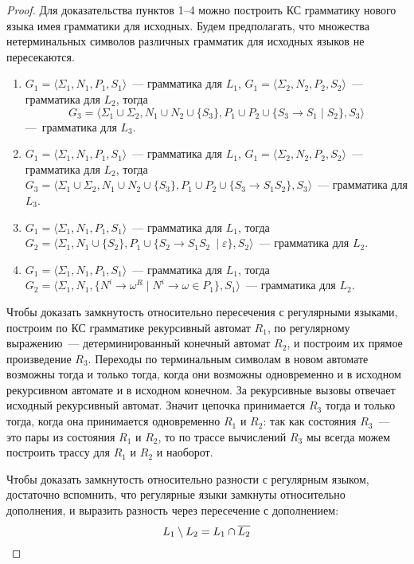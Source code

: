 \begin{proof}
    Для доказательства пунктов 1--4 можно построить КС грамматику нового языка имея грамматики для исходных.
    Будем предполагать, что множества нетерминальных символов различных грамматик для исходных языков не пересекаются.
    \begin{enumerate}
        \item $G_1=\langle\Sigma_1,N_1,P_1,S_1\rangle$~--- грамматика для $L_1$, $G_1=\langle\Sigma_2,N_2,P_2,S_2\rangle$~--- грамматика для $L_2$, тогда 
        \[G_3=\langle\Sigma_1 \cup \Sigma_2, N_1 \cup N_2 \cup \{S_3\}, P_1 \cup P_2 \cup \{S_3 \to S_1 \mid S_2\} ,S_3\rangle\] ---~грамматика для $L_3$.
        \item $G_1=\langle\Sigma_1,N_1,P_1,S_1\rangle$~--- грамматика для $L_1$, $G_1=\langle\Sigma_2,N_2,P_2,S_2\rangle$~--- грамматика для $L_2$, тогда $G_3=\langle\Sigma_1 \cup \Sigma_2, N_1 \cup N_2 \cup \{S_3\}, P_1 \cup P_2 \cup \{S_3 \to S_1 S_2\} ,S_3\rangle$~--- грамматика для $L_3$.
        \item $G_1=\langle\Sigma_1,N_1,P_1,S_1\rangle$~--- грамматика для $L_1$, тогда $G_2=\langle\Sigma_1, N_1 \cup \{S_2\}, P_1 \cup \{S_2 \to S_1 S_2\ \mid \varepsilon\}, S_2\rangle$~--- грамматика для $L_2$.
        \item $G_1=\langle\Sigma_1,N_1,P_1,S_1\rangle$~--- грамматика для $L_1$, тогда $G_2=\langle\Sigma_1, N_1, \{N^i \to \omega^R \mid N^i \to \omega \in P_1 \}, S_1\rangle$~--- грамматика для $L_2$.
    \end{enumerate}

    Чтобы доказать замкнутость относительно пересечения с регулярными языками, построим по КС грамматике рекурсивный автомат $R_1$, по регулярному выражению~--- детерминированный конечный автомат $R_2$, и построим их прямое произведение $R_3$.
    Переходы по терминальным символам в новом автомате возможны тогда и только тогда, когда они возможны одновременно и в исходном рекурсивном автомате и в исходном конечном.
    За рекурсивные вызовы отвечает исходный рекурсивный автомат.
    Значит цепочка принимается $R_3$ тогда и только тогда, когда она принимается одновременно $R_1$ и $R_2$: так как состояния $R_3$~--- это пары из состояния $R_1$ и $R_2$, то по трассе вычислений $R_3$ мы всегда можем построить трассу для $R_1$ и $R_2$ и наоборот.

    Чтобы доказать замкнутость относительно разности с регулярным языком, достаточно вспомнить, что регулярные языки замкнуты относительно дополнения, и выразить разность через пересечение с дополнением:
    \[L_1 \setminus L_2 = L_1 \cap \overline{L_2} \qedhere\]
\end{proof}

